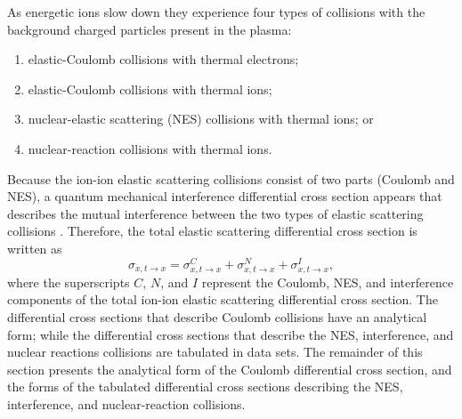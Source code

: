 \documentclass[../main.tex]{subfiles}
\begin{document}
As energetic ions slow down they experience four types of collisions with the background charged particles present in the plasma:
\begin{enumerate}
    \item elastic-Coulomb collisions with thermal electrons;
    \item elastic-Coulomb collisions with thermal ions;
    \item nuclear-elastic scattering (NES) collisions with thermal ions; or
    \item nuclear-reaction collisions with thermal ions.
\end{enumerate}
Because the ion-ion elastic scattering collisions consist of two parts (Coulomb and NES), a quantum mechanical interference differential cross section appears that describes the mutual interference between the two types of elastic scattering collisions \cite{Devaney-1971}. Therefore, the total elastic scattering differential cross section is written as
\begin{equation}
    \sigma_{x,t \rightarrow x} = \sigma_{x,t \rightarrow x}^C + \sigma_{x,t \rightarrow x}^N + \sigma_{x,t \rightarrow x}^I,
\end{equation}
where the superscripts $C$, $N$, and $I$ represent the Coulomb, NES, and interference components of the total ion-ion elastic scattering differential cross section. The differential cross sections that describe Coulomb collisions have an analytical form; while the differential cross sections that describe the NES, interference, and nuclear reactions collisions are tabulated in data sets. The remainder of this section presents the analytical form of the Coulomb differential cross section, and the forms of the tabulated differential cross sections describing the NES, interference, and nuclear-reaction collisions.








\end{document}
